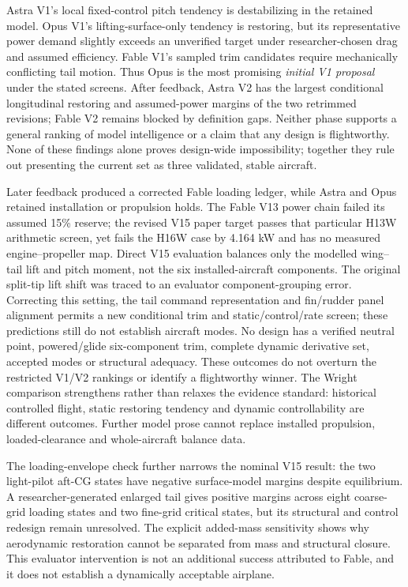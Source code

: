 \documentclass[11pt,a4paper]{article}
\begin{document}
Astra V1's local fixed-control pitch tendency is destabilizing in the retained model. Opus V1's lifting-surface-only tendency is restoring, but its representative power demand slightly exceeds an unverified target under researcher-chosen drag and assumed efficiency. Fable V1's sampled trim candidates require mechanically conflicting tail motion. Thus Opus is the most promising \emph{initial V1 proposal} under the stated screens. After feedback, Astra V2 has the largest conditional longitudinal restoring and assumed-power margins of the two retrimmed revisions; Fable V2 remains blocked by definition gaps. Neither phase supports a general ranking of model intelligence or a claim that any design is flightworthy. None of these findings alone proves design-wide impossibility; together they rule out presenting the current set as three validated, stable aircraft.

Later feedback produced a corrected Fable loading ledger, while Astra and Opus retained installation or propulsion holds. The Fable V13 power chain failed its assumed 15\% reserve; the revised V15 paper target passes that particular H13W arithmetic screen, yet fails the H16W case by 4.164 kW and has no measured engine--propeller map. Direct V15 evaluation balances only the modelled wing--tail lift and pitch moment, not the six installed-aircraft components. The original split-tip lift shift was traced to an evaluator component-grouping error. Correcting this setting, the tail command representation and fin/rudder panel alignment permits a new conditional trim and static/control/rate screen; these predictions still do not establish aircraft modes. No design has a verified neutral point, powered/glide six-component trim, complete dynamic derivative set, accepted modes or structural adequacy. These outcomes do not overturn the restricted V1/V2 rankings or identify a flightworthy winner. The Wright comparison strengthens rather than relaxes the evidence standard: historical controlled flight, static restoring tendency and dynamic controllability are different outcomes. Further model prose cannot replace installed propulsion, loaded-clearance and whole-aircraft balance data.

The loading-envelope check further narrows the nominal V15 result: the two light-pilot aft-CG states have negative surface-model margins despite equilibrium. A researcher-generated enlarged tail gives positive margins across eight coarse-grid loading states and two fine-grid critical states, but its structural and control redesign remain unresolved. The explicit added-mass sensitivity shows why aerodynamic restoration cannot be separated from mass and structural closure. This evaluator intervention is not an additional success attributed to Fable, and it does not establish a dynamically acceptable airplane.
\end{document}
